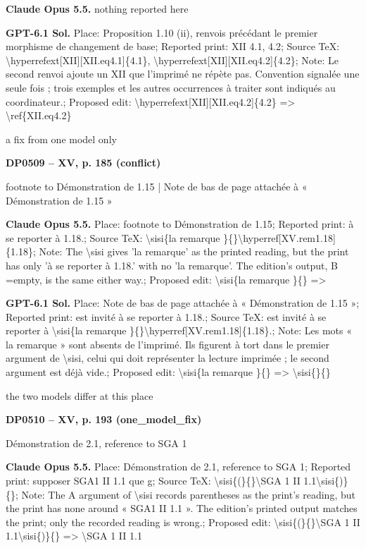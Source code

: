 \textbf{Claude Opus 5.5.} nothing reported here\par
\textbf{GPT-6.1 Sol.} Place: Proposition 1.10 (ii), renvois précédant le premier morphisme de changement de base; Reported print: XII 4.1, 4.2; Source TeX: \textbackslash{}hyperrefext[XII][XII.eq4.1]\{4.1\}, \textbackslash{}hyperrefext[XII][XII.eq4.2]\{4.2\}; Note: Le second renvoi ajoute un XII que l'imprimé ne répète pas. Convention signalée une seule fois ; trois exemples et les autres occurrences à traiter sont indiqués au coordinateur.; Proposed edit: \textbackslash{}hyperrefext[XII][XII.eq4.2]\{4.2\} =\allowbreak > \textbackslash{}ref\{XII.eq4.2\}\par
a fix from one model only\par
\par\noindent\hypertarget{DP0509}{}\textbf{DP0509 -- XV, p. 185 (conflict)}\par
footnote to Démonstration de 1.15 | Note de bas de page attachée à « Démonstration de 1.15 »\par
\textbf{Claude Opus 5.5.} Place: footnote to Démonstration de 1.15; Reported print: à se reporter à 1.18.; Source TeX: \textbackslash{}sisi\{la remarque \}\{\}\textbackslash{}hyperref[XV.rem1.18]\{1.18\}; Note: The \textbackslash{}sisi gives 'la remarque' as the printed reading, but the print has only 'à se reporter à 1.18.' with no 'la remarque'. The edition's output, B =\allowbreak  empty, is the same either way.; Proposed edit: \textbackslash{}sisi\{la remarque \}\{\} =\allowbreak > \par
\textbf{GPT-6.1 Sol.} Place: Note de bas de page attachée à « Démonstration de 1.15 »; Reported print: est invité à se reporter à 1.18.; Source TeX: est invité à se reporter à \textbackslash{}sisi\{la remarque \}\{\}\textbackslash{}hyperref[XV.rem1.18]\{1.18\}.; Note: Les mots « la remarque » sont absents de l'imprimé. Ils figurent à tort dans le premier argument de \textbackslash{}sisi, celui qui doit représenter la lecture imprimée ; le second argument est déjà vide.; Proposed edit: \textbackslash{}sisi\{la remarque \}\{\} =\allowbreak > \textbackslash{}sisi\{\}\{\}\par
the two models differ at this place\par
\par\noindent\hypertarget{DP0510}{}\textbf{DP0510 -- XV, p. 193 (one\_model\_fix)}\par
Démonstration de 2.1, reference to SGA 1\par
\textbf{Claude Opus 5.5.} Place: Démonstration de 2.1, reference to SGA 1; Reported print: supposer SGA1 II 1.1 que g; Source TeX: \textbackslash{}sisi\{(\}\{\}\textbackslash{}SGA 1 II 1.1\textbackslash{}sisi\{)\}\{\}; Note: The A argument of \textbackslash{}sisi records parentheses as the print's reading, but the print has none around « SGA1 II 1.1 ». The edition's printed output matches the print; only the recorded reading is wrong.; Proposed edit: \textbackslash{}sisi\{(\}\{\}\textbackslash{}SGA 1 II 1.1\textbackslash{}sisi\{)\}\{\} =\allowbreak > \textbackslash{}SGA 1 II 1.1\par
